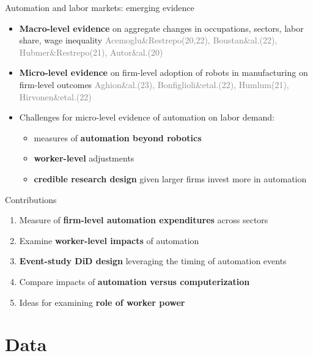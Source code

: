 \documentclass[aspectratio=169]{beamer}
\begin{document}
\begin{frame}{Automation and labor markets: emerging evidence \hyperlink{otherstudies}{}} \label{literature}
\begin{itemize}
  \item<1-> \textbf{Macro-level evidence} on aggregate changes in occupations, sectors, labor share, wage inequality \textcolor{gray}{\scriptsize{Acemoglu\&Restrepo(20,22), Boustan\&al.(22), Hubmer\&Restrepo(21), Autor\&al.(20)}}\medskip
  \item<2-> \textbf{Micro-level evidence} on firm-level adoption of robots in manufacturing on firm-level outcomes \textcolor{gray}{\scriptsize{Aghion\&al.(23), Bonfiglioli\&etal.(22), Humlum(21), Hirvonen\&etal.(22)}}\medskip
  \item<3-> Challenges for micro-level evidence of automation on labor demand: \medskip
  \begin{itemize}
  \item measures of \textbf{automation beyond robotics} \medskip
  \item \textbf{worker-level} adjustments \medskip
  \item \textbf{credible research design} given larger firms invest more in automation
  \end{itemize}
\end{itemize} 
\end{frame}

\begin{frame}{Contributions}
\begin{enumerate}
    \item<1-> Measure of \textbf{firm-level automation expenditures} across sectors \bigskip
    \item<2-> Examine \textbf{worker-level impacts} of automation \bigskip
    \item<3-> \textbf{Event-study DiD design} leveraging the timing of automation events
    \bigskip %
    \item<4-> Compare impacts of \textbf{automation versus computerization}\bigskip
    \item<5-> Ideas for examining \textbf{role of worker power}
\end{enumerate}
\end{frame}

\section{Data}
\end{document}
